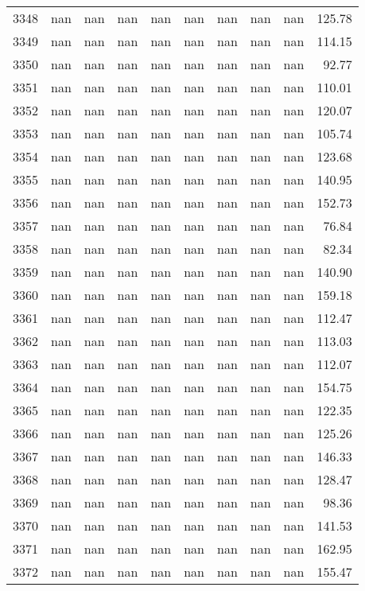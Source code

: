 \begin{tabular}{lrrrrrrrrr}
3348 & nan & nan & nan & nan & nan & nan & nan & nan & 125.78 \\
3349 & nan & nan & nan & nan & nan & nan & nan & nan & 114.15 \\
3350 & nan & nan & nan & nan & nan & nan & nan & nan & 92.77 \\
3351 & nan & nan & nan & nan & nan & nan & nan & nan & 110.01 \\
3352 & nan & nan & nan & nan & nan & nan & nan & nan & 120.07 \\
3353 & nan & nan & nan & nan & nan & nan & nan & nan & 105.74 \\
3354 & nan & nan & nan & nan & nan & nan & nan & nan & 123.68 \\
3355 & nan & nan & nan & nan & nan & nan & nan & nan & 140.95 \\
3356 & nan & nan & nan & nan & nan & nan & nan & nan & 152.73 \\
3357 & nan & nan & nan & nan & nan & nan & nan & nan & 76.84 \\
3358 & nan & nan & nan & nan & nan & nan & nan & nan & 82.34 \\
3359 & nan & nan & nan & nan & nan & nan & nan & nan & 140.90 \\
3360 & nan & nan & nan & nan & nan & nan & nan & nan & 159.18 \\
3361 & nan & nan & nan & nan & nan & nan & nan & nan & 112.47 \\
3362 & nan & nan & nan & nan & nan & nan & nan & nan & 113.03 \\
3363 & nan & nan & nan & nan & nan & nan & nan & nan & 112.07 \\
3364 & nan & nan & nan & nan & nan & nan & nan & nan & 154.75 \\
3365 & nan & nan & nan & nan & nan & nan & nan & nan & 122.35 \\
3366 & nan & nan & nan & nan & nan & nan & nan & nan & 125.26 \\
3367 & nan & nan & nan & nan & nan & nan & nan & nan & 146.33 \\
3368 & nan & nan & nan & nan & nan & nan & nan & nan & 128.47 \\
3369 & nan & nan & nan & nan & nan & nan & nan & nan & 98.36 \\
3370 & nan & nan & nan & nan & nan & nan & nan & nan & 141.53 \\
3371 & nan & nan & nan & nan & nan & nan & nan & nan & 162.95 \\
3372 & nan & nan & nan & nan & nan & nan & nan & nan & 155.47 \\

\end{tabular}
